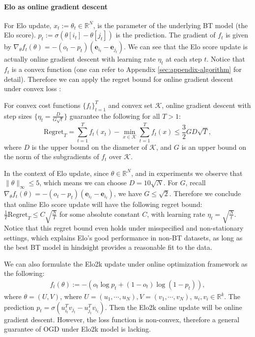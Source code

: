 \paragraph{Elo as online gradient descent} For Elo update, $x_t:= \theta_t \in \mathbb{R}^{N}$,  is the parameter of the underlying BT model (the Elo score). $p_t:=\sigma(\theta[i_t]-\theta[j_t])$ is the prediction. The gradient of $f_t$ is given by $\nabla_{\theta} f_t(\theta)= - (o_t - p_t) (\boldsymbol{e}_{i_t}- \boldsymbol{e}_{j_t})$. We can see that the Elo score update is actually online gradient descent with learning rate $\eta_t$ at each step $t$. Notice that $f_t$ is a convex function (one can refer to Appendix \ref{sec:appendix-algorithm} for detail). Therefore we can apply the regret bound for online gradient descent under convex loss \citep[Theorem 3.1]{hazan2016introduction}:
\begin{theorem}
\label{thm:OCO}
For convex cost functions $\{f_t\}_{t=1}^{T}$ and convex set $\mathcal{K}$, online gradient descent with step sizes $\{\eta_t = \frac{D}{G\sqrt{t}}\}$ guarantee the following for all $T>1$:
\begin{equation*}
\text{Regret}_T = \sum_{t=1}^{T}f_t(x_t) - \min_{x \in \mathcal{K}} \sum_{t=1}^{T} f_t(x) \leq \frac32 GD\sqrt{T},     
\end{equation*}
where $D$ is the upper bound on the diameter of $\mathcal{K}$, and $G$ is an upper bound on the norm of the subgradients of $f_t$ over $\mathcal{K}$.  
\end{theorem}
In the context of Elo update, since $\theta \in \mathbb{R}^{N}$, and in experiments we observe that $\|\theta\|_{\infty} \leq 5$, which means we can choose $D = 10 \sqrt{N}$. For $G$,  recall $\nabla_{\theta}f_t(\theta) = -(o_t-p_t)(\boldsymbol{e}_{i_t} - \boldsymbol{e}_{i_t})$, we have $G \leq \sqrt{2}$. Therefore we conclude that online Elo score update will have the following regret bound: $\frac{1}{T} \text{Regret}_T \leq C \sqrt{\frac{N}{T}}$ for some absolute constant $C$, with learning rate $\eta_t = \sqrt{\frac{N}{t}}$. Notice that this regret bound even holds under misspecified and non-stationary settings, which explains Elo's good performance in non-BT datasets, as long as the best BT model in hindsight provides a reasonable fit to the data.

We can also formulate the Elo2k update under online optimization framework as the following:  
\begin{align*}
    f_t(\theta) := - (o_t \log  p_t + (1-o_t) \log (1-p_t)) ,
\end{align*}
where $\theta = (U, V)$, where $U= (u_1, \cdots, u_N), V = (v_1, \cdots, v_N)$, $u_i, v_i \in \mathbb{R}^{k}$. The prediction $p_t=\sigma(u_{i_t}^{T}v_{j_t}-u_{j_t}^{T}v_{i_t})$. Then the Elo2k online update will be online gradient descent. However, the loss function is non-convex, therefore a general guarantee of OGD under Elo2k model is lacking. 





